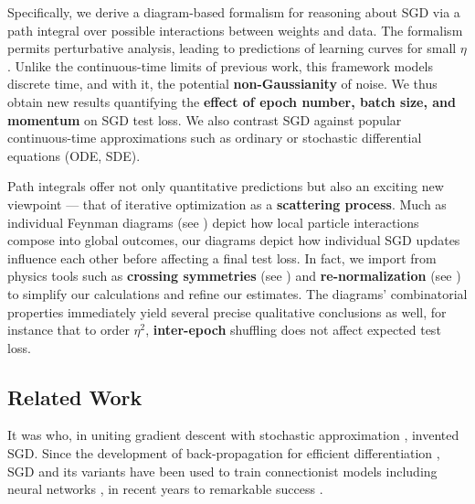 \documentclass{article}
\begin{document}
    Specifically, we derive a diagram-based formalism for reasoning about SGD
    via a path integral over possible interactions between weights and data.
    The formalism permits perturbative analysis, leading to predictions of
    learning curves for small $\eta$.  Unlike the continuous-time limits of
    previous work, this framework models discrete time, and with it, the
    potential {\bf non-Gaussianity} of noise.  We thus obtain new results
    quantifying the {\bf effect of epoch number, batch size, and momentum} on
    SGD test loss.  We also contrast SGD against popular continuous-time
    approximations such as ordinary or stochastic differential equations (ODE,
    SDE).
    
    Path integrals offer not only quantitative predictions but also an exciting
    new viewpoint --- that of iterative optimization as a {\bf scattering
    process}.  Much as individual Feynman diagrams (see \citet{dy49a}) depict
    how local particle interactions compose into global outcomes, our diagrams
    depict how individual SGD updates influence each other before affecting a
    final test loss.  In fact, we import from physics tools such as {\bf
    crossing symmetries} (see \citet{dy49b}) and {\bf re-normalization} (see
    \citet{ge54}) to simplify our calculations and refine our estimates.
    The diagrams' combinatorial properties immediately yield several precise
    qualitative conclusions as well, for instance that to order $\eta^2$, {\bf
    inter-epoch} shuffling does not affect expected test loss.



\subsection{Related Work}
    It was \citet{ki52} who, in uniting gradient descent \citep{ca47} with
    stochastic approximation \citep{ro51}, invented SGD.  Since the development
    of back-propagation for efficient differentiation \citep{we74}, SGD and its
    variants have been used to train connectionist models including neural
    networks \citep{bo91}, in recent years to remarkable success \citep{le15}.
\end{document}
